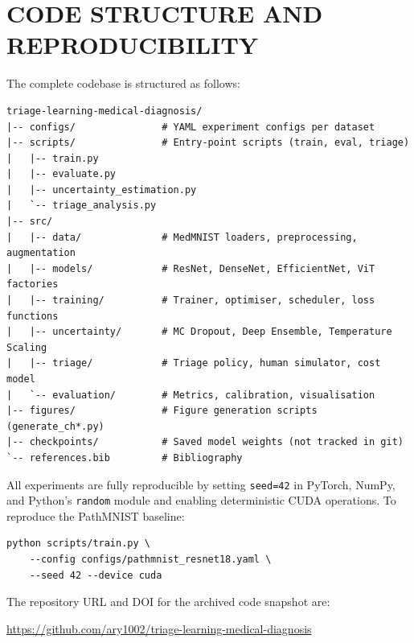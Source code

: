\documentclass[12pt,a4paper]{report}
\begin{document}
\chapter{CODE STRUCTURE AND REPRODUCIBILITY}
\label{app:code}

The complete codebase is structured as follows:

\begin{verbatim}
triage-learning-medical-diagnosis/
|-- configs/               # YAML experiment configs per dataset
|-- scripts/               # Entry-point scripts (train, eval, triage)
|   |-- train.py
|   |-- evaluate.py
|   |-- uncertainty_estimation.py
|   `-- triage_analysis.py
|-- src/
|   |-- data/              # MedMNIST loaders, preprocessing, augmentation
|   |-- models/            # ResNet, DenseNet, EfficientNet, ViT factories
|   |-- training/          # Trainer, optimiser, scheduler, loss functions
|   |-- uncertainty/       # MC Dropout, Deep Ensemble, Temperature Scaling
|   |-- triage/            # Triage policy, human simulator, cost model
|   `-- evaluation/        # Metrics, calibration, visualisation
|-- figures/               # Figure generation scripts (generate_ch*.py)
|-- checkpoints/           # Saved model weights (not tracked in git)
`-- references.bib         # Bibliography
\end{verbatim}

All experiments are fully reproducible by setting \texttt{seed=42} in PyTorch,
NumPy, and Python's \texttt{random} module and enabling deterministic CUDA
operations. To reproduce the PathMNIST baseline:

\begin{verbatim}
python scripts/train.py \
    --config configs/pathmnist_resnet18.yaml \
    --seed 42 --device cuda
\end{verbatim}

\noindent The repository URL and DOI for the archived code snapshot are:

\begin{center}
\url{https://github.com/ary1002/triage-learning-medical-diagnosis}
\end{center}
\end{document}
